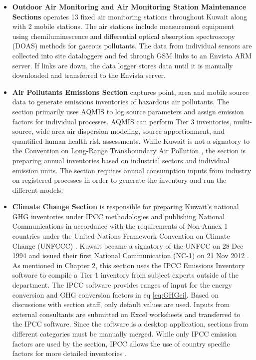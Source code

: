 \begin{itemize}
\item \textbf{Outdoor Air Monitoring and Air Monitoring Station Maintenance Sections}  operates 13 fixed air monitoring stations throughout Kuwait along with 2 mobile stations. The air stations include measurement equipment using  chemiluminescence and differential optical absorption spectroscopy (DOAS) methods for gaseous pollutants. The data from individual sensors are collected into site dataloggers and fed through GSM links to an Envista ARM server. If links are down, the data logger stores data until it is manually downloaded and transferred to the Envista server. 

\item \textbf{Air Pollutants Emissions Section} captures point, area and mobile source data to generate emissions inventories of hazardous air pollutants. The section primarily uses AQMIS to log source parameters and assign emission factors for individual processes. AQMIS can perform Tier 3 inventories, multi-source, wide area air dispersion modeling, source apportionment, and quantified human health risk assessments. While Kuwait is not a signatory to the Convention on Long-Range Transboundary Air Pollution \citep{UN1979}, the section is preparing annual inventories based on industrial sectors and individual emission units. The section requires annual consumption inputs from industry  on registered processes in order to generate the inventory and run the different models.

\item \textbf{Climate Change Section} is responsible for preparing Kuwait's  national GHG inventories under IPCC methodologies and publishing National Communications in accordance with the requirements of  Non-Annex 1 countries under the United Nations Framework Convention on Climate Change (UNFCCC) \citep{unfccc2014}. Kuwait became a signatory of the UNFCC on 28 Dec 1994 and issued their first National Communication (NC-1) on 21 Nov 2012 \citep{kepa2012}. As mentioned in Chapter 2, this section uses the IPCC Emissions Inventory software to compile a Tier 1 inventory from subject experts outside of the department. The IPCC software provides ranges of input for the energy conversion and GHG conversion factors in eq \ref{eq:GHGei}. Based on discussions with section staff, only default values are used. Inputs from external consultants are submitted on Excel worksheets and transferred to the IPCC software. Since the software is a desktop application, sections from different categories must be manually merged. While only IPCC emission factors are used by the section, IPCC allows the use of country specific factors for more detailed inventories \citep{ipcc2006}.


\end{itemize}
